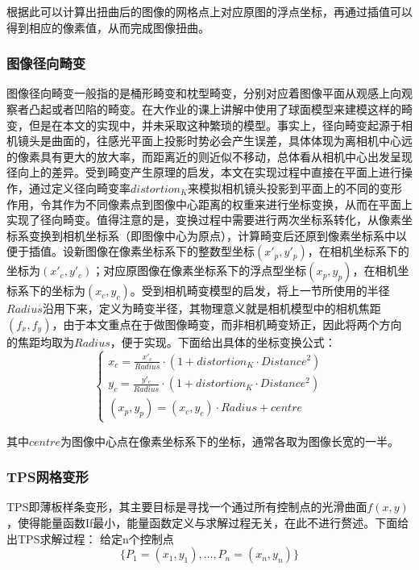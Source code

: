 \documentclass[UTF8]{ctexart}
\begin{document}
根据此可以计算出扭曲后的图像的网格点上对应原图的浮点坐标，再通过插值可以得到相应的像素值，从而完成图像扭曲。

\subsubsection{图像径向畸变}

图像径向畸变一般指的是桶形畸变和枕型畸变，分别对应着图像平面从观感上向观察者凸起或者凹陷的畸变。在大作业的课上讲解中使用了球面模型来建模这样的畸变，但是在本文的实现中，并未采取这种繁琐的模型。事实上，径向畸变起源于相机镜头是曲面的，往感光平面上投影时势必会产生误差，具体体现为离相机中心远的像素具有更大的放大率，而距离近的则近似不移动，总体看从相机中心出发呈现径向上的差异。受到畸变产生原理的启发，本文在实现过程中直接在平面上进行操作，通过定义径向畸变率$distortion_K$来模拟相机镜头投影到平面上的不同的变形作用，令其作为不同像素点到图像中心距离的权重来进行坐标变换，从而在平面上实现了径向畸变。值得注意的是，变换过程中需要进行两次坐标系转化，从像素坐标系变换到相机坐标系（即图像中心为原点），计算畸变后还原到像素坐标系中以便于插值。设新图像在像素坐标系下的整数型坐标$(x'_p,y'_p)$，在相机坐标系下的坐标为$(x'_c,y'_c)$；对应原图像在像素坐标系下的浮点型坐标$(x_p,y_p)$，在相机坐标系下的坐标为$(x_c,y_c)$。受到相机畸变模型的启发，将上一节所使用的半径$Radius$沿用下来，定义为畸变半径，其物理意义就是相机模型中的相机焦距$(f_x,f_y)$，由于本文重点在于做图像畸变，而非相机畸变矫正，因此将两个方向的焦距均取为$Radius$，便于实现。下面给出具体的坐标变换公式：
\begin{equation}
    \begin{cases}
        x_c = \frac{x'_c}{Radius} \cdot (1+distortion_K \cdot Distance^2)\\
        y_c = \frac{y'_c}{Radius} \cdot (1+distortion_K \cdot Distance^2)\\
        (x_p,y_p) = (x_c,y_c)\cdot Radius + centre
    \end{cases}
\end{equation}

其中$centre$为图像中心点在像素坐标系下的坐标，通常各取为图像长宽的一半。

\subsubsection{TPS网格变形}
TPS即薄板样条变形，其主要目标是寻找一个通过所有控制点的光滑曲面$f(x,y)$，使得能量函数If最小，能量函数定义与求解过程无关，在此不进行赘述。下面给出TPS求解过程：
给定n个控制点$$\{P_1=(x_1,y_1),\dots,P_n=(x_n,y_n)\}$$
\end{document}

